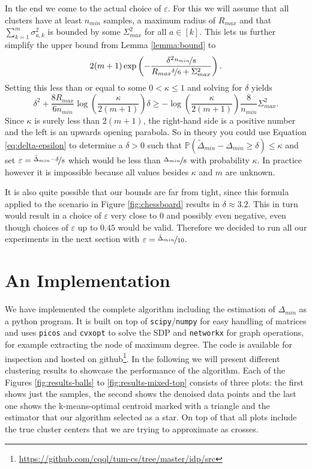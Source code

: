 \documentclass[10pt,a4paper]{article}
\begin{document}
In the end we come to the actual choice of $\varepsilon$.
For this we will assume that all clusters have at least $n_{min}$ samples, a maximum radius of $R_{max}$ and that $\sum_{k = 1}^{m} \sigma_{a,k}^{2}$ is bounded by some $\Sigma_{max}^{2}$ for all $a \in [k]$.
This lets us further simplify the upper bound from Lemma \ref{lemma:bound} to
\begin{equation*}
  2(m + 1)\exp\left( -\frac{\delta^{2} \nicefrac{n_{min}}{8}}{R_{max} \nicefrac{\delta}{6} + \Sigma_{max}^{2}} \right).
\end{equation*}
Setting this less than or equal to some $0 < \kappa \le 1$ and solving for $\delta$ yields
\begin{equation}
  \delta^{2} + \frac{8R_{max}}{6n_{min}}\log\left( \frac{\kappa}{2(m + 1)} \right)\delta \ge -\log\left( \frac{\kappa}{2(m + 1)} \right)\frac{8}{n_{min}}\Sigma_{max}^{2}.
  \label{eq:delta-epsilon}
\end{equation}
Since $\kappa$ is surely less than $2(m + 1)$, the right-hand side is a positive number and the left is an upwards opening parabola.
So in theory you could use Equation \eqref{eq:delta-epsilon} to determine a $\delta > 0$ such that $\mathbb{P}(\tilde{\Delta}_{min} - \Delta_{min} \ge \delta) \le \kappa$ and set $\varepsilon = \nicefrac{\tilde{\Delta}_{min} - \delta}{8}$ which would be less than $\nicefrac{\Delta_{min}}{8}$ with probability $\kappa$.
In practice however it is impossible because all values besides $\kappa$ and $m$ are unknown.

It is also quite possible that our bounds are far from tight, since this formula applied to the scenario in Figure \ref{fig:chessboard} results in $\delta \approx 3.2$.
This in turn would result in a choice of $\varepsilon$ very close to $0$ and possibly even negative, even though choices of $\varepsilon$ up to $0.45$ would be valid.
Therefore we decided to run all our experiments in the next section with $\varepsilon = \nicefrac{\tilde{\Delta}_{min}}{10}$.

\section{An Implementation}
\label{sec:results}

We have implemented the complete algorithm including the estimation of $\Delta_{min}$ as a python program.
It is built on top of \texttt{scipy}/\texttt{numpy} for easy handling of matrices and uses \texttt{picos} and \texttt{cvxopt} to solve the SDP and \texttt{networkx} for graph operations, for example extracting the node of maximum degree.
The code is available for inspection and hosted on github\footnote{\url{https://github.com/cqql/tum-cs/tree/master/idp/src}}.
In the following we will present different clustering results to showcase the performance of the algorithm.
Each of the Figures \ref{fig:results-balls} to \ref{fig:results-mixed-top} consists of three plots: the first shows just the samples, the second shows the denoised data points and the last one shows the k-means-optimal centroid marked with a triangle and the estimator that our algorithm selected as a star.
On top of that all plots include the true cluster centers that we are trying to approximate as crosses.
\end{document}
